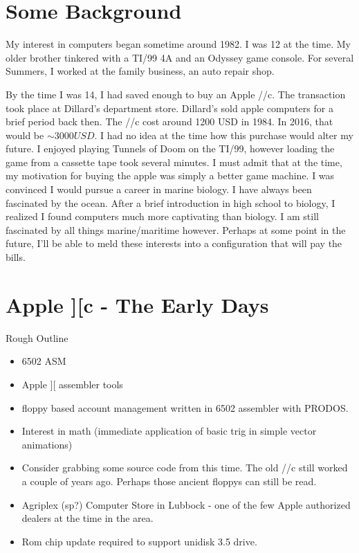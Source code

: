 
\section{Some  Background}
My interest in computers began sometime around 1982. I was 12 at the
time. My older brother tinkered with a TI/99 4A and an Odyssey game
console. For several Summers, I worked at the family business, an auto
repair shop. 

By the time I was 14, I had saved enough to buy an Apple
//c. The transaction took place at Dillard's department store. Dillard's
sold apple computers for a brief period back then. The //c
cost around 1200 USD in 1984. In 2016, that would be ${\sim} 3000 USD$.
I had no idea at the time how this purchase would alter my future.
I enjoyed playing Tunnels of Doom on the TI/99, however loading the 
game from a cassette tape took several minutes. I must admit that at
the time, my motivation for buying the apple was simply a better game
machine. I was convinced I would pursue a career in marine 
biology. I have always been fascinated by the ocean. After a brief 
introduction in high school to biology, I realized I found computers 
much more captivating than biology. I am still fascinated by
all things marine/maritime however. Perhaps at some point in the
future, I'll be able to meld these interests into a configuration that
will pay the bills.

\section{Apple ][c - The Early Days}
	Rough Outline
	\begin{itemize}
	\item 6502 ASM
	\item Apple ][ assembler tools
	\item floppy based account management written in 6502 assembler with PRODOS.
	\item Interest in math (immediate application of basic trig in simple vector animations)
	\item Consider grabbing some source code from this time. The
          old //c still worked a couple of years ago. Perhaps those
          ancient floppys can still be read.
       \item Agriplex (sp?) Computer Store in Lubbock - one of the few Apple
         authorized dealers at the time in the area.
       \item Rom chip update required to support unidisk 3.5 drive.
	\end{itemize}
